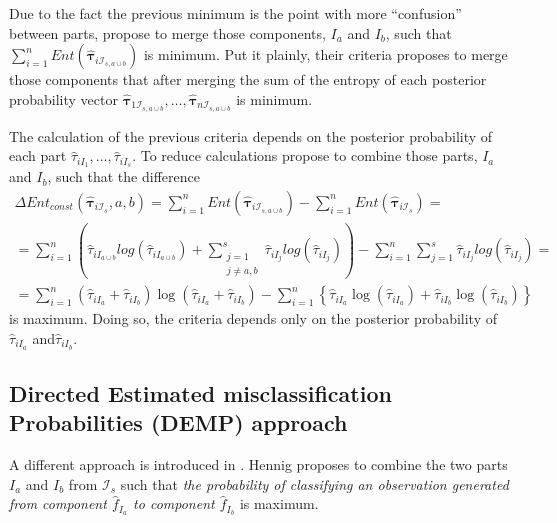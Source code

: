 \documentclass[10pt, a4paper]{article}
\newcommand{\m}[1]{\boldsymbol{#1}}
\begin{document}
Due to the fact the previous minimum is the point with more ``confusion'' between parts, \cite{baudry2010combining} propose to merge those components, $I_a$ and $I_b$, such that $\sum_{i=1}^n Ent( \hat{\m \tau}_{i \mathcal{I}_{s, a \cup b}} )$ is minimum. Put it plainly, their criteria proposes to merge those components that after merging the sum of the entropy of each posterior probability vector $\hat{\m \tau}_{1 \mathcal{I}_{s, a \cup b}}, \dots, \hat{\m \tau}_{n \mathcal{I}_{s, a \cup b}}$ is minimum.

The calculation of the previous criteria depends on the posterior probability of each part $\hat{\tau}_{iI_1}, \dots,\hat{\tau}_{iI_s}$. To reduce calculations \cite{baudry2010combining} propose to combine those parts, $I_a$ and $I_b$, such that the difference 
\begin{multline*}
\Delta Ent_{const}(\hat{\m \tau}_{i \mathcal{I}_s}, a, b) = \sum_{i=1}^n Ent( \hat{\m \tau}_{i \mathcal{I}_{s, a \cup b}}) - \sum_{i=1}^n Ent( \hat{\m \tau}_{i \mathcal{I}_s}) =  \\ = \sum_{i=1}^n  \left( \hat{\tau}_{i I_{a\cup b}}  log(\hat{\tau}_{i I_{a\cup b}} ) +  \sum_{\substack{j=1 \\
                                                            j \neq a, b}}^s \hat{\tau}_{i I_j}  log(\hat{\tau}_{i I_j} ) \right)  - \sum_{i=1}^n \sum_{j=1}^s \hat{\tau}_{i I_j}  log(\hat{\tau}_{i I_j} ) = \\  =   \sum_{i=1}^n  (\hat{\tau}_{iI_a}+\hat{\tau}_{iI_b}) \log(\hat{\tau}_{iI_a} + \hat{\tau}_{iI_b}) - \sum_{i=1}^n \left\{ \hat{\tau}_{iI_a} \log(\hat{\tau}_{iI_a}) + \hat{\tau}_{iI_b} \log(\hat{\tau}_{iI_b})\right\}
\end{multline*}
is maximum. Doing so, the criteria depends only on the posterior probability of $\hat{\tau}_{iI_a}$ and$ \hat{\tau}_{iI_b}$.


\subsection{Directed Estimated misclassification Probabilities (DEMP) approach}

A different approach is introduced in \cite{hennig2010methods}. Hennig proposes to combine the two parts $I_a$ and $I_b$ from $ \mathcal{I}_s$ such that \emph{the probability of classifying an observation generated from component $\hat{f}_{I_a}$ to component $\hat{f}_{I_b}$} is maximum. 
\end{document}
